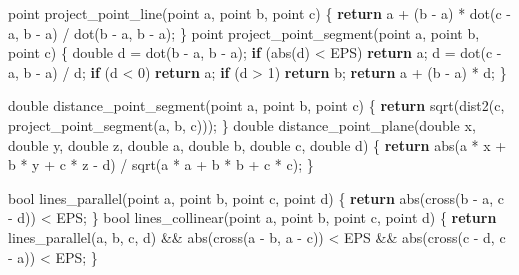 \documentclass[10pt,]{article}
\newenvironment{Shaded}{}{}
\newcommand{\KeywordTok}[1]{\textcolor[rgb]{0.00,0.44,0.13}{\textbf{{#1}}}}
\newcommand{\DataTypeTok}[1]{\textcolor[rgb]{0.56,0.13,0.00}{{#1}}}
\newcommand{\DecValTok}[1]{\textcolor[rgb]{0.25,0.63,0.44}{{#1}}}
\newcommand{\NormalTok}[1]{{#1}}
\begin{document}
\begin{Shaded}
\begin{Highlighting}[]
\NormalTok{point project_point_line(point a, point b, point c) \{}
  \KeywordTok{return} \NormalTok{a + (b - a) * dot(c - a, b - a) / dot(b - a, b - a);}
\NormalTok{\}}
\NormalTok{point project_point_segment(point a, point b, point c) \{}
  \DataTypeTok{double} \NormalTok{d = dot(b - a, b - a);}
  \KeywordTok{if} \NormalTok{(abs(d) < EPS) }\KeywordTok{return} \NormalTok{a;}
  \NormalTok{d = dot(c - a, b - a) / d;}
  \KeywordTok{if} \NormalTok{(d < }\DecValTok{0}\NormalTok{) }\KeywordTok{return} \NormalTok{a;}
  \KeywordTok{if} \NormalTok{(d > }\DecValTok{1}\NormalTok{) }\KeywordTok{return} \NormalTok{b;}
  \KeywordTok{return} \NormalTok{a + (b - a) * d;}
\NormalTok{\}}

\DataTypeTok{double} \NormalTok{distance_point_segment(point a, point b, point c) \{}
  \KeywordTok{return} \NormalTok{sqrt(dist2(c, project_point_segment(a, b, c)));}
\NormalTok{\}}
\DataTypeTok{double} \NormalTok{distance_point_plane(}\DataTypeTok{double} \NormalTok{x, }\DataTypeTok{double} \NormalTok{y, }\DataTypeTok{double} \NormalTok{z,}
    \DataTypeTok{double} \NormalTok{a, }\DataTypeTok{double} \NormalTok{b, }\DataTypeTok{double} \NormalTok{c, }\DataTypeTok{double} \NormalTok{d) \{}
  \KeywordTok{return} \NormalTok{abs(a * x + b * y + c * z - d) / sqrt(a * a + b * b + c * c);}
\NormalTok{\}}

\DataTypeTok{bool} \NormalTok{lines_parallel(point a, point b, point c, point d) \{}
  \KeywordTok{return} \NormalTok{abs(cross(b - a, c - d)) < EPS;}
\NormalTok{\}}
\DataTypeTok{bool} \NormalTok{lines_collinear(point a, point b, point c, point d) \{}
  \KeywordTok{return} \NormalTok{lines_parallel(a, b, c, d) &&}
    \NormalTok{abs(cross(a - b, a - c)) < EPS &&}
    \NormalTok{abs(cross(c - d, c - a)) < EPS;}
\NormalTok{\}}


\end{Highlighting}
\end{Shaded}
\end{document}
